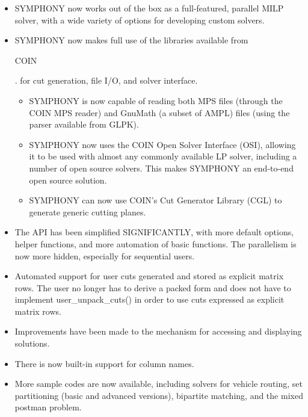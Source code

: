 \begin{itemize}

\item SYMPHONY now works out of the box as a full-featured, parallel MILP solver,
with a wide variety of options for developing custom solvers.

\item SYMPHONY now makes full use of the libraries available from 
\emph{}
\begin{latexonly} 
COIN
\end{latexonly}.
for cut generation, file I/O, and solver interface.

\begin{itemize}

    \item SYMPHONY is now capable of reading both MPS files (through the COIN
MPS reader) and GnuMath (a subset of AMPL) files (using the parser available
from GLPK).

    \item SYMPHONY now uses the COIN Open Solver Interface (OSI), allowing it to
be used with almost any commonly available LP solver, including a number of
open source solvers. This makes SYMPHONY an end-to-end open source solution.

    \item SYMPHONY can now use COIN's Cut Generator Library (CGL) to generate
generic cutting planes.

\end{itemize}

\item The API has been simplified SIGNIFICANTLY, with more default options,
helper functions, and more automation of basic functions. The parallelism is
now more hidden, especially for sequential users.

\item Automated support for user cuts generated and stored as explicit matrix
rows. The user no longer has to derive a packed form and does not have to
implement user\_unpack\_cuts() in order to use cuts expressed as explicit matrix
rows. 

\item Improvements have been made to the mechanism for accessing and displaying
solutions.

\item There is now built-in support for column names.

\item More sample codes are now available, including solvers for vehicle routing,
set partitioning (basic and advanced versions), bipartite matching, and the
mixed postman problem.


\end{itemize}
